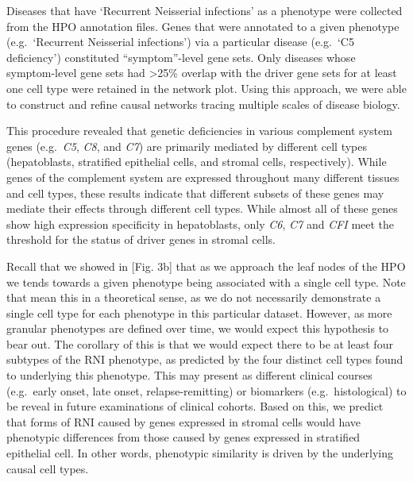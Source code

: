 \documentclass[
]{article}
\begin{document}
Diseases that have `Recurrent Neisserial infections' as a phenotype were
collected from the HPO annotation files. Genes that were annotated to a
given phenotype (e.g.~`Recurrent Neisserial infections') via a
particular disease (e.g.~`C5 deficiency') constituted ``symptom''-level
gene sets. Only diseases whose symptom-level gene sets had
\textgreater25\% overlap with the driver gene sets for at least one cell
type were retained in the network plot. Using this approach, we were
able to construct and refine causal networks tracing multiple scales of
disease biology.

This procedure revealed that genetic deficiencies in various complement
system genes (e.g.~\emph{C5}, \emph{C8}, and \emph{C7}) are primarily
mediated by different cell types (hepatoblasts, stratified epithelial
cells, and stromal cells, respectively). While genes of the complement
system are expressed throughout many different tissues and cell types,
these results indicate that different subsets of these genes may mediate
their effects through different cell types. While almost all of these
genes show high expression specificity in hepatoblasts, only \emph{C6},
\emph{C7} and \emph{CFI} meet the threshold for the status of driver
genes in stromal cells.

Recall that we showed in {[}Fig. 3b{]} that as we approach the leaf
nodes of the HPO we tends towards a given phenotype being associated
with a single cell type. Note that mean this in a theoretical sense, as
we do not necessarily demonstrate a single cell type for each phenotype
in this particular dataset. However, as more granular phenotypes are
defined over time, we would expect this hypothesis to bear out. The
corollary of this is that we would expect there to be at least four
subtypes of the RNI phenotype, as predicted by the four distinct cell
types found to underlying this phenotype. This may present as different
clinical courses (e.g.~early onset, late onset, relapse-remitting) or
biomarkers (e.g.~histological) to be reveal in future examinations of
clinical cohorts. Based on this, we predict that forms of RNI caused by
genes expressed in stromal cells would have phenotypic differences from
those caused by genes expressed in stratified epithelial cell. In other
words, phenotypic similarity is driven by the underlying causal cell
types.
\end{document}
